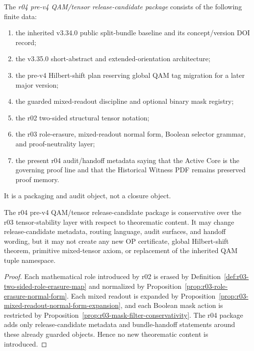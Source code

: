\begin{definition}
\label{def:r04-pre-v4-qam-tensor-release-candidate-package}
The \emph{r04 pre-v4 QAM/tensor release-candidate package} consists of the following finite data:
\begin{enumerate}[label=(\roman*)]
  \item the inherited v3.34.0 public split-bundle baseline and its concept/version DOI record;
  \item the v3.35.0 short-abstract and extended-orientation architecture;
  \item the pre-v4 Hilbert-shift plan reserving global QAM tag migration for a later major version;
  \item the guarded mixed-readout discipline and optional binary mask registry;
  \item the r02 two-sided structural tensor notation;
  \item the r03 role-erasure, mixed-readout normal form, Boolean selector grammar, and proof-neutrality layer;
  \item the present r04 audit/handoff metadata saying that the Active Core is the governing proof line and that the Historical Witness PDF remains preserved proof memory.
\end{enumerate}
It is a packaging and audit object, not a closure object.
\end{definition}

\begin{proposition}
\label{prop:r04-release-candidate-conservativity}
The r04 pre-v4 QAM/tensor release-candidate package is conservative over the r03 tensor-stability layer with respect to theorematic content.  It may change release-candidate metadata, routing language, audit surfaces, and handoff wording, but it may not create any new OP certificate, global Hilbert-shift theorem, primitive mixed-tensor axiom, or replacement of the inherited QAM tuple namespace.
\end{proposition}

\begin{proof}
Each mathematical role introduced by r02 is erased by Definition~\ref{def:r03-two-sided-role-erasure-map} and normalized by Proposition~\ref{prop:r03-role-erasure-normal-form}.  Each mixed readout is expanded by Proposition~\ref{prop:r03-mixed-readout-normal-form-expansion}, and each Boolean mask action is restricted by Proposition~\ref{prop:r03-mask-filter-conservativity}.  The r04 package adds only release-candidate metadata and bundle-handoff statements around these already guarded objects.  Hence no new theorematic content is introduced.
\end{proof}

